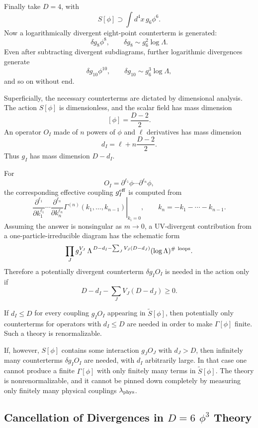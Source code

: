Finally take \(D=4\), with
\[
  S[\phi]\supset \int d^4x\,g_6\phi^6 .
\]
Now a logarithmically divergent eight-point counterterm is generated:
\[
  \delta g_8\phi^8,\qquad
  \delta g_8\sim g_6^2\log\Lambda .
\]
Even after subtracting divergent subdiagrams, further logarithmic divergences
generate
\[
  \delta g_{10}\phi^{10},\qquad
  \delta g_{10}\sim g_6^3\log\Lambda ,
\]
and so on without end.

Superficially, the necessary counterterms are dictated by dimensional
analysis.  The action \(S[\phi]\) is dimensionless, and the scalar field has
mass dimension
\[
  [\phi]=\frac{D-2}{2}.
\]
An operator \(O_I\) made of \(n\) powers of \(\phi\) and \(\ell\) derivatives
has mass dimension
\[
  d_I=\ell+n\frac{D-2}{2}.
\]
Thus \(g_I\) has mass dimension \(D-d_I\).

For
\[
  O_I=\partial^{\ell_1}\phi\cdots \partial^{\ell_n}\phi ,
\]
the corresponding effective coupling \(g_I^{\rm eff}\) is computed from
\[
  \left.
  \frac{\partial^{\ell_1}}{\partial k_1^{\ell_1}}
  \cdots
  \frac{\partial^{\ell_n}}{\partial k_n^{\ell_n}}
  \Gamma^{(n)}(k_1,\ldots,k_{n-1})
  \right|_{k_i=0},
  \qquad
  k_n=-k_1-\cdots-k_{n-1}.
\]
Assuming the answer is nonsingular as \(m\to0\), a UV-divergent contribution
from a one-particle-irreducible diagram has the schematic form
\[
  \prod_J g_J^{V_J}\,
  \Lambda^{\,D-d_I-\sum_J V_J(D-d_J)}
  (\log\Lambda)^{\#\ {\rm loops}} .
\]
Therefore a potentially divergent counterterm \(\delta g_I O_I\) is needed
in the action only if
\[
  D-d_I-\sum_J V_J(D-d_J)\ge 0 .
\]

If \(d_I\le D\) for every coupling \(g_IO_I\) appearing in
\(\widetilde S[\phi]\), then potentially only counterterms for operators with
\(d_I\le D\) are needed in order to make \(\Gamma[\phi]\) finite.  Such a
theory is renormalizable.

If, however, \(S[\phi]\) contains some interaction \(g_JO_J\) with
\(d_J>D\), then infinitely many counterterms \(\delta g_IO_I\) are needed,
with \(d_I\) arbitrarily large.  In that case one cannot produce a finite
\(\Gamma[\phi]\) with only finitely many terms in \(\widetilde S[\phi]\).
The theory is nonrenormalizable, and it cannot be pinned down completely by
measuring only finitely many physical couplings \(\lambda_{\rm phys}\).

\subsection[Cancellation of Divergences in D=6 phi3 Theory]
{Cancellation of Divergences in \(D=6\) \(\phi^3\) Theory}

